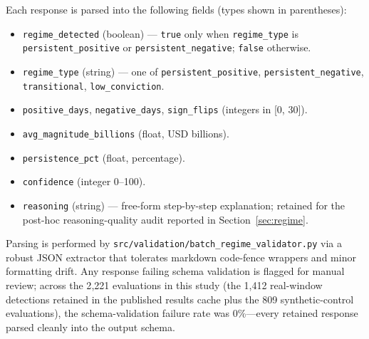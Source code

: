 Each response is parsed into the following fields (types shown in
parentheses):

\begin{itemize}
    \item \texttt{regime\_detected} (boolean) --- \texttt{true} only when
          \texttt{regime\_type} is \texttt{persistent\_positive} or
          \texttt{persistent\_negative}; \texttt{false} otherwise.
    \item \texttt{regime\_type} (string) --- one of
          \texttt{persistent\_positive}, \texttt{persistent\_negative},
          \texttt{transitional}, \texttt{low\_conviction}.
    \item \texttt{positive\_days}, \texttt{negative\_days},
          \texttt{sign\_flips} (integers in [0, 30]).
    \item \texttt{avg\_magnitude\_billions} (float, USD billions).
    \item \texttt{persistence\_pct} (float, percentage).
    \item \texttt{confidence} (integer 0--100).
    \item \texttt{reasoning} (string) --- free-form step-by-step
          explanation; retained for the post-hoc reasoning-quality audit
          reported in Section~\ref{sec:regime}.
\end{itemize}

\noindent
Parsing is performed by \texttt{src/validation/batch\_regime\_validator.py}
via a robust JSON extractor that tolerates markdown code-fence wrappers
and minor formatting drift. Any response failing schema validation is
flagged for manual review; across the 2{,}221 evaluations in this study
(the 1{,}412 real-window detections retained in the published results
cache plus the 809 synthetic-control evaluations), the schema-validation
failure rate was 0\%---every retained response parsed cleanly into the
output schema.
